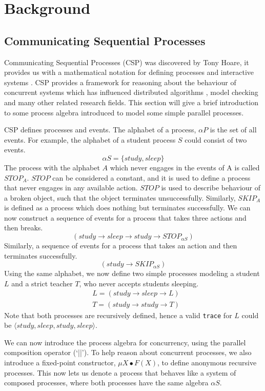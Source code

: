 \chapter{Background}
\section{Communicating Sequential Processes} \label{csp_section}
Communicating Sequential Processes (CSP) was discovered by Tony Hoare, it provides us with a mathematical notation for defining processes and interactive systems \cite{csp_paper}. CSP provides a framework for reasoning about the behaviour of concurrent systems which has influenced distributed algorithms \cite{distributed_algorithms_na_lynch}, model checking \cite{model_checking} and many other related research fields. This section will give a brief introduction to some process algebra introduced to model some simple parallel processes.
\par
CSP defines processes and events. The alphabet of a process, $\alpha P$ is the set of all events. For example, the alphabet of a student process $S$ could consist of two events.
\[
\alpha S = \{study, sleep\}
\]
The process with the alphabet $A$ which never engages in the events of A is called $STOP_A$. $STOP$ can be considered a constant, and it is used to define a process that never engages in any available action. $STOP$ is used to describe behaviour of a broken object, such that the object terminates unsuccessfully. Similarly, $SKIP_A$ is defined as a process which does nothing but terminates successfully. We can now construct a sequence of events for a process that takes three actions and then breaks.
\[
(study \rightarrow sleep \rightarrow study \rightarrow STOP_{\alpha S})
\]
Similarly, a sequence of events for a process that takes an action and then terminates successfully.
\[
(study \rightarrow SKIP_{\alpha S})
\]
Using the same alphabet, we now define two simple processes modeling a student $L$ and a strict teacher $T$, who never accepts students sleeping.
\[
\begin{aligned}
& L = (study \rightarrow sleep \rightarrow L) \\
& T = (study \rightarrow study \rightarrow T) 
\end{aligned}
\]
Note that both processes are recursively defined, hence a valid \texttt{trace} for $L$ could be $\langle study, sleep, study, sleep \rangle$.
\par
We can now introduce the process algebra for concurrency, using the parallel composition operator (`||'). To help reason about concurrent processes, we also introduce a fixed-point constructor, $\mu X \bullet F(X)$, to define anonymous recursive processes. This now lets us denote a process that behaves like a system of composed processes, where both processes have the same algebra $\alpha S$.
